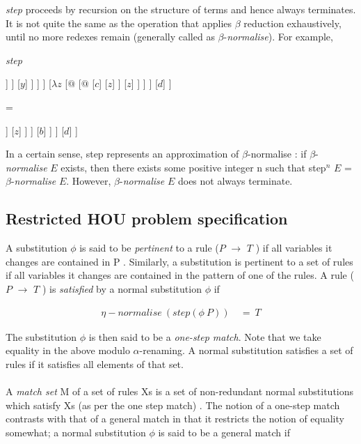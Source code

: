 \vspace{1em}
\noindent
\emph{step} proceeds by recursion on the structure of terms and hence always terminates. It is not quite the same as the operation that applies $\beta$ reduction exhaustively, until no more redexes remain (generally called as $\beta$-\emph{normalise}). For example,

\vspace{1em}
\emph{step}
\qquad
\begin{adjustbox}{valign=c}
\begin{forest}
[$@$
	[$@$
		[$\lambda x$
			[$\lambda y$
				[$@$
					[$@$
						[$a$]
						[$@$
							[$x$]
							[$b$]						
						]
					]
					[$y$]				
				]			
			]		
		]
		[$\lambda z$
			[$@$
				[$@$
					[$c$]
					[$z$]				
				]
				[$z$]			
			]		
		]
	]
	[$d$]
]
\end{forest}
\end{adjustbox}\qquad
=
\qquad
\begin{adjustbox}{valign=c}
\begin{forest}
[$@$
	[$@$
		[$a$]
		[$@$
			[$\lambda z$
				[$@$
					[$@$
						[$c$]
						[$z$]					
					]
					[$z$]				
				]			
			]
			[$b$]		
		]	
	]
	[$d$]
]
\end{forest}
\end{adjustbox}

\noindent
In a certain sense, step represents an approximation of $\beta$-normalise : if $\beta$-\emph{normalise} $E$ exists, then there exists some positive integer n such that step$^n$ $E$ = $\beta$-\emph{normalise} $E$. However, $\beta$-\emph{normalise} $E$ does not always terminate.

\subsection{Restricted HOU problem specification}
A substitution $\phi$ is said to be \emph{pertinent} to a rule ($P$ $\rightarrow$ $T$ ) if all variables it changes are contained in P . Similarly, a substitution is pertinent to a set of rules if all variables it changes are contained in the pattern of one of the rules. A rule ($P$ $\rightarrow$ $T$ ) is \emph{satisfied} by a normal substitution $\phi$ if

\begin{align*}
\eta -normalise \: (step (\phi \: P )) \: &= \: T
\end{align*}

\vspace{1em}
\noindent
The substitution $\phi$ is then said to be a \emph{one-step match}. Note that we take equality in the above modulo $\alpha$-renaming. A normal substitution satisfies a set of rules if it satisfies all elements of that set.\\\\
A \emph{match set} M of a set of rules Xs is a set of non-redundant normal substitutions which satisfy Xs (as per the one step match) . The notion of a one-step match contrasts with that of a general match in that it restricts the notion of equality somewhat; a normal substitution $\phi$ is said to be a general match if


